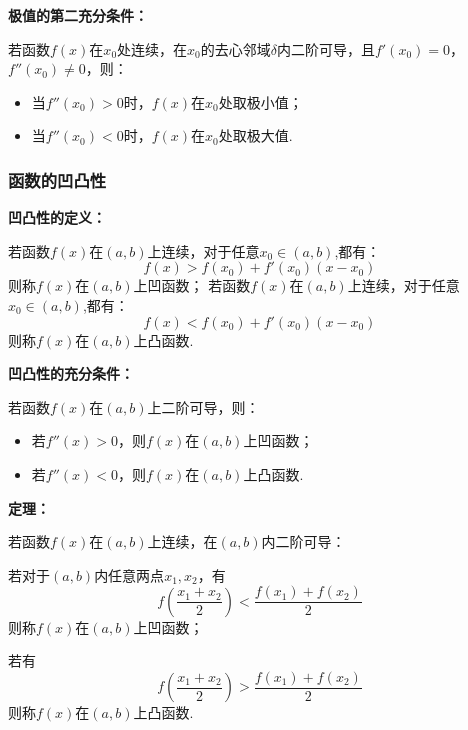 \documentclass[12pt , a4paper , oneside]{ctexart}
\begin{document}
            \textbf{极值的第二充分条件：}
            \begin{mdframed}
            若函数$f(x)$在$x_0$处连续，在$x_0$的去心邻域$\delta$内二阶可导，且$f'(x_0) = 0$，$f''(x_0) \neq 0$，则：
            \begin{itemize}
                \item 当$f''(x_0) > 0$时，$f(x)$在$x_0$处取极小值；
                \item 当$f''(x_0) < 0$时，$f(x)$在$x_0$处取极大值.
            \end{itemize}
            \end{mdframed}

            \subsubsection{函数的凹凸性}
            \textbf{凹凸性的定义：}
            \begin{mdframed}
            若函数$f(x)$在$(a,b)$上连续，对于任意$x_0 \in (a,b)$,都有：
            $$f(x) > f(x_0) + f'(x_0) (x-x_0)$$
            则称$f(x)$在$(a,b)$上凹函数；
            若函数$f(x)$在$(a,b)$上连续，对于任意$x_0 \in (a,b)$,都有：
            $$f(x) < f(x_0) + f'(x_0) (x-x_0)$$
            则称$f(x)$在$(a,b)$上凸函数.
            \end{mdframed}

            \textbf{凹凸性的充分条件：}
            \begin{mdframed}
            若函数$f(x)$在$(a,b)$上二阶可导，则：
            \begin{itemize}
                \item 若$f''(x) > 0$，则$f(x)$在$(a,b)$上凹函数；
                \item 若$f''(x) < 0$，则$f(x)$在$(a,b)$上凸函数.
            \end{itemize}
            \end{mdframed}

            \textbf{定理：}
            \begin{mdframed}
            若函数$f(x)$在$(a,b)$上连续，在$(a,b)$内二阶可导：
            
            若对于$(a,b)$内任意两点$x_1,x_2$，有
            $$f(\frac{x_1+x_2}{2}) < \frac{f(x_1)+f(x_2)}{2}$$
            则称$f(x)$在$(a,b)$上凹函数；
            
            若有
            $$f(\frac{x_1+x_2}{2}) > \frac{f(x_1)+f(x_2)}{2}$$
            则称$f(x)$在$(a,b)$上凸函数.
            \end{mdframed}
\end{document}
